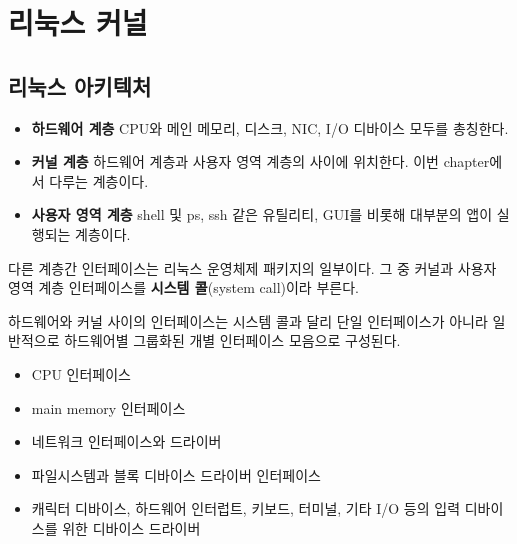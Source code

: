 \chapter{리눅스 커널}
\section{리눅스 아키텍처}
\begin{itemize}
    \item \textbf{하드웨어 계층}\newline
        CPU와 메인 메모리, 디스크, NIC, I/O 디바이스 모두를 총칭한다.
    \item \textbf{커널 계층}\newline
        하드웨어 계층과 사용자 영역 계층의 사이에 위치한다.\newline
        이번 chapter에서 다루는 계층이다.
    \item \textbf{사용자 영역 계층}\newline
        shell 및 ps, ssh 같은 유틸리티, GUI를 비롯해 
        대부분의 앱이 실행되는 계층이다.
\end{itemize}

\begin{flushleft}
    다른 계층간 인터페이스는 리눅스 운영체제 패키지의 일부이다.
    그 중 커널과 사용자 영역 계층 인터페이스를 \textbf{시스템 콜}(system call)이라 부른다.
\end{flushleft}

\begin{flushleft}
    하드웨어와 커널 사이의 인터페이스는 시스템 콜과 달리 
    단일 인터페이스가 아니라 
    일반적으로 하드웨어별 그룹화된 개별 인터페이스 모음으로 구성된다.

    \begin{itemize}
        \item CPU 인터페이스
        \item main memory 인터페이스
        \item 네트워크 인터페이스와 드라이버
        \item 파일시스템과 블록 디바이스 드라이버 인터페이스
        \item 캐릭터 디바이스, 하드웨어 인터럽트, 
        키보드, 터미널, 기타 I/O 등의 입력 디바이스를 위한 디바이스 드라이버
    \end{itemize}
\end{flushleft}
\newpage

